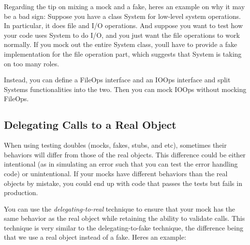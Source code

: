 Regarding the tip on mixing a mock and a fake, here\textquotesingle{}s an example on why it may be a bad sign\+: Suppose you have a class {\ttfamily System} for low-\/level system operations. In particular, it does file and I/O operations. And suppose you want to test how your code uses {\ttfamily System} to do I/O, and you just want the file operations to work normally. If you mock out the entire {\ttfamily System} class, you\textquotesingle{}ll have to provide a fake implementation for the file operation part, which suggests that {\ttfamily System} is taking on too many roles.

Instead, you can define a {\ttfamily File\+Ops} interface and an {\ttfamily I\+O\+Ops} interface and split {\ttfamily System}\textquotesingle{}s functionalities into the two. Then you can mock {\ttfamily I\+O\+Ops} without mocking {\ttfamily File\+Ops}.

\subsection*{Delegating Calls to a Real Object}

When using testing doubles (mocks, fakes, stubs, and etc), sometimes their behaviors will differ from those of the real objects. This difference could be either intentional (as in simulating an error such that you can test the error handling code) or unintentional. If your mocks have different behaviors than the real objects by mistake, you could end up with code that passes the tests but fails in production.

You can use the {\itshape delegating-\/to-\/real} technique to ensure that your mock has the same behavior as the real object while retaining the ability to validate calls. This technique is very similar to the delegating-\/to-\/fake technique, the difference being that we use a real object instead of a fake. Here\textquotesingle{}s an example\+:


